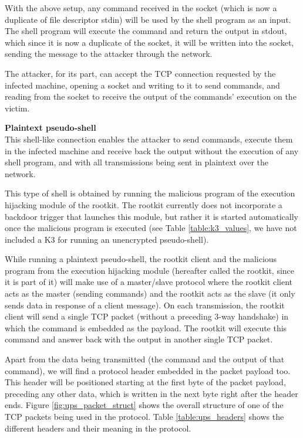 With the above setup, any command received in the socket (which is now a duplicate of file descriptor stdin) will be used by the shell program as an input. The shell program will execute the command and return the output in stdout, which since it is now a duplicate of the socket, it will be written into the socket, sending the message to the attacker through the network.

The attacker, for its part, can accept the TCP connection requested by the infected machine, opening a socket and writing to it to send commands, and reading from the socket to receive the output of the commands' execution on the victim.
 
 
 
\textbf{Plaintext pseudo-shell}\\
This shell-like connection enables the attacker to send commands, execute them in the infected machine and receive back the output without the execution of any shell program, and with all transmissions being sent in plaintext over the network.

This type of shell is obtained by running the malicious program of the execution hijacking module of the rootkit. The rootkit currently does not incorporate a backdoor trigger that launches this module, but rather it is started automatically once the malicious program is executed (see Table \ref{table:k3_values}, we have not included a K3 for running an unencrypted pseudo-shell).

While running a plaintext pseudo-shell, the rootkit client and the malicious program from the execution hijacking module (hereafter called the rootkit, since it is part of it) will make use of a master/slave protocol where the rootkit client acts as the master (sending commands) and the rootkit acts as the slave (it only sends data in response of a client message). On each transmission, the rootkit client will send a single TCP packet (without a preceding 3-way handshake) in which the command is embedded as the payload. The rootkit will execute this command and answer back with the output in another single TCP packet.

Apart from the data being transmitted (the command and the output of that command), we will find a protocol header embedded in the packet payload too. This header will be positioned starting at the first byte of the packet payload, preceding any other data, which is written in the next byte right after the header ends. Figure \ref{fig:ups_packet_struct} shows the overall structure of one of the TCP packets being used in the protocol. Table \ref{table:ups_headers} shows the different headers and their meaning in the protocol.

